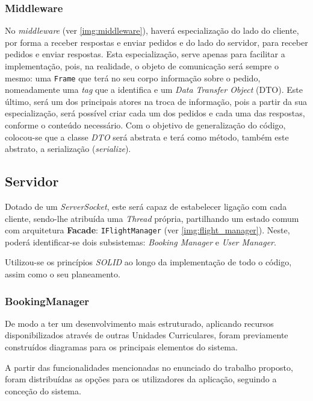 \documentclass[a4paper,11pt]{scrreprt}
\begin{document}
\subsubsection{Middleware}

No \textit{middleware} (ver \ref{img:middleware}), haverá especialização do lado do cliente, por forma a receber respostas e enviar pedidos e
do lado do servidor, para receber pedidos e enviar respostas.
Esta especialização, serve apenas para facilitar a implementação, pois, na realidade, o objeto de comunicação
será sempre o mesmo: uma \texttt{Frame} que terá no seu corpo informação sobre o pedido, nomeadamente
uma \textit{tag} que a identifica e um \textit{Data Transfer Object} (DTO).
Este último, será um dos principais atores na troca de informação, pois a partir da sua especialização,
será possível criar cada um dos pedidos e cada uma das respostas, conforme o conteúdo necessário.
Com o objetivo de generalização do código, colocou-se que a classe \textit{DTO} será abstrata e terá como método,
também este abstrato, a serialização (\textit{serialize}).

\subsection{Servidor}
Dotado de um \textit{ServerSocket}, este será capaz de estabelecer ligação com cada cliente,
sendo-lhe atribuída uma \textit{Thread} própria, partilhando um estado comum com arquitetura \textbf{Facade}: 
\texttt{IFlightManager} (ver \ref{img:flight_manager}).
Neste, poderá identificar-se dois subsistemas: \textit{Booking Manager} e \textit{User Manager}.

Utilizou-se os princípios \textit{SOLID} \cite{wiki:solid} ao longo da implementação de todo o código,
assim como o seu planeamento.

\subsubsection{BookingManager}


De modo a ter um desenvolvimento mais estruturado, aplicando recursos disponibilizados através de outras 
Unidades Curriculares, foram previamente construídos diagramas para os principais elementos do sistema.

A partir das funcionalidades mencionadas no enunciado do trabalho proposto, foram distribuídas as opções para os
utilizadores da aplicação, seguindo a conceção do sistema.
\end{document}
